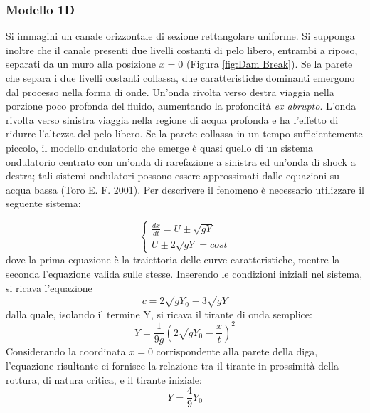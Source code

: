 \documentclass[12pt]{article} %
\begin{document}
\subsubsection{Modello 1D}
\noindent Si immagini un canale orizzontale di sezione rettangolare uniforme. Si supponga inoltre che il canale presenti due livelli costanti di pelo libero, entrambi a riposo, separati da un muro alla posizione $x=0$ (Figura \ref{fig:Dam Break}).
\noindent Se la parete che separa i due livelli costanti collassa, due caratteristiche dominanti emergono dal processo nella forma di onde. Un'onda rivolta verso destra viaggia nella porzione poco profonda del fluido, aumentando la profondità \textit{ex abrupto}. L'onda rivolta verso sinistra viaggia nella regione di acqua profonda e ha l'effetto di ridurre l'altezza del pelo libero. Se la parete collassa in un tempo sufficientemente piccolo, il modello ondulatorio che emerge è quasi quello di un sistema ondulatorio centrato con un'onda di rarefazione a sinistra ed un'onda di shock a destra; tali sistemi ondulatori possono essere approssimati dalle equazioni su acqua bassa (Toro E. F. 2001).
Per descrivere il fenomeno è necessario utilizzare il seguente sistema:

\begin{equation}
    \begin{cases}\frac{dx}{dt}=U\pm\sqrt{gY}\\
    U\pm2\sqrt{gY}=cost
    \end{cases}
    \label{eqn:Diga}
\end{equation}
dove la prima equazione è la traiettoria delle curve caratteristiche, mentre la seconda l'equazione valida sulle stesse.
Inserendo le condizioni iniziali nel sistema, si ricava l'equazione
\begin{equation}
    c=2\sqrt{gY_0}-3\sqrt{gY}
\end{equation}
dalla quale, isolando il termine Y, si ricava il tirante di onda semplice:
\begin{equation}
Y=\frac{1}{9g}(2\sqrt{gY_0}-\frac{x}{t})^2
\end{equation}
Considerando la coordinata $x=0$ corrispondente alla parete della diga, l'equazione risultante ci fornisce la relazione tra il tirante in prossimità della rottura, di natura critica, e il tirante iniziale:
\begin{equation}
    Y=\frac{4}{9}Y_0
\end{equation}
\end{document}
